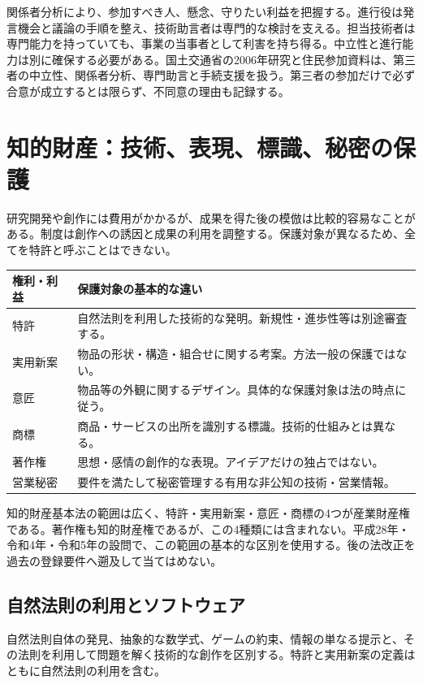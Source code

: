 関係者分析により、参加すべき人、懸念、守りたい利益を把握する。進行役は発言機会と議論の手順を整え、技術助言者は専門的な検討を支える。担当技術者は専門能力を持っていても、事業の当事者として利害を持ち得る。中立性と進行能力は別に確保する必要がある。国土交通省の2006年研究と住民参加資料は、第三者の中立性、関係者分析、専門助言と手続支援を扱う\parencite{mlit_mediation2006,mlit_pi_thirdparty}。第三者の参加だけで必ず合意が成立するとは限らず、不同意の理由も記録する。

\section{知的財産：技術、表現、標識、秘密の保護}
\label{theory:compliance:ip}
研究開発や創作には費用がかかるが、成果を得た後の模倣は比較的容易なことがある。制度は創作への誘因と成果の利用を調整する。保護対象が異なるため、全てを特許と呼ぶことはできない。

\begin{center}
\begin{tabular}{p{.19\linewidth}p{.69\linewidth}}
\hline
権利・利益 & 保護対象の基本的な違い\\ \hline
特許 & 自然法則を利用した技術的な発明。新規性・進歩性等は別途審査する。\\
実用新案 & 物品の形状・構造・組合せに関する考案。方法一般の保護ではない。\\
意匠 & 物品等の外観に関するデザイン。具体的な保護対象は法の時点に従う。\\
商標 & 商品・サービスの出所を識別する標識。技術的仕組みとは異なる。\\
著作権 & 思想・感情の創作的な表現。アイデアだけの独占ではない。\\
営業秘密 & 要件を満たして秘密管理する有用な非公知の技術・営業情報。\\ \hline
\end{tabular}
\end{center}
知的財産基本法の範囲は広く、特許・実用新案・意匠・商標の4つが産業財産権である。著作権も知的財産権であるが、この4種類には含まれない\parencite{ip_basic_act,jpo_ip_overview}。平成28年・令和4年・令和5年の設問で、この範囲の基本的な区別を使用する。後の法改正を過去の登録要件へ遡及して当てはめない。

\subsection{自然法則の利用とソフトウェア}
\label{theory:compliance:invention}
自然法則自体の発見、抽象的な数学式、ゲームの約束、情報の単なる提示と、その法則を利用して問題を解く技術的な創作を区別する。特許と実用新案の定義はともに自然法則の利用を含む\parencite{jpo_patent_utility}。

